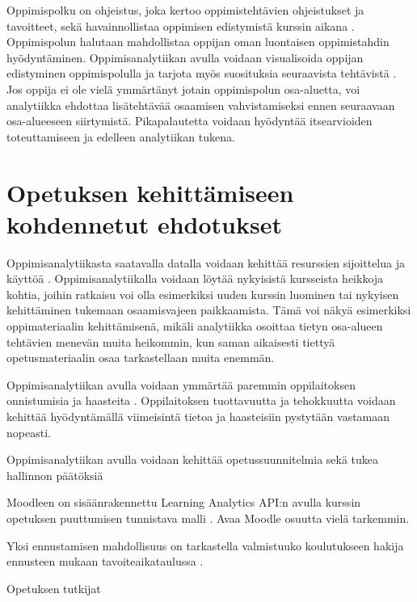 Oppimispolku on ohjeistus, joka kertoo oppimistehtävien ohjeistukset ja tavoitteet, sekä havainnollistaa oppimisen edistymistä kurssin aikana \citep{toivolaFlippedLearningKaanteinen2017}. Oppimispolun halutaan mahdollistaa oppijan oman luontaisen oppimistahdin hyödyntäminen. Oppimisanalytiikan avulla voidaan visualisoida oppijan edistyminen oppimispolulla ja tarjota myös suosituksia seuraavista tehtävistä \citep{longPenetratingFogAnalytics2011}. Jos oppija ei ole vielä ymmärtänyt jotain oppimispolun osa-aluetta, voi analytiikka ehdottaa lisätehtävää osaamisen vahvistamiseksi ennen seuraavaan osa-alueeseen siirtymistä. Pikapalautetta voidaan hyödyntää itsearvioiden toteuttamiseen ja edelleen analytiikan tukena.


\section{Opetuksen kehittämiseen kohdennetut ehdotukset}

\color{blue}
Oppimisanalytiikasta saatavalla datalla voidaan kehittää resurssien sijoittelua ja käyttöä \citep{longPenetratingFogAnalytics2011}. Oppimisanalytiikalla voidaan löytää nykyisistä kursseista heikkoja kohtia, joihin ratkaisu voi olla esimerkiksi uuden kurssin luominen tai nykyisen kehittäminen tukemaan osaamisvajeen paikkaamista. Tämä voi näkyä esimerkiksi oppimateriaalin kehittämisenä, mikäli analytiikka osoittaa tietyn osa-alueen tehtävien menevän muita heikommin, kun saman aikaisesti tiettyä opetusmateriaalin osaa tarkastellaan muita enemmän.

Oppimisanalytiikan avulla voidaan ymmärtää paremmin oppilaitoksen onnistumisia ja haasteita \citep{longPenetratingFogAnalytics2011}. Oppilaitoksen tuottavuutta ja tehokkuutta voidaan kehittää hyödyntämällä viimeisintä tietoa ja haasteisiin pystytään vastamaan nopeasti.

Oppimisanalytiikan avulla voidaan kehittää opetussuunnitelmia sekä tukea hallinnon päätöksiä \citep{romeroEducationalDataMining2010,longPenetratingFogAnalytics2011}

Moodleen on sisäänrakennettu Learning Analytics API:n avulla kurssin opetuksen puuttumisen tunnistava malli \citep{monllaoAnalyticsAPIMoodleDocs2021}. \color{red} Avaa Moodle osuutta vielä tarkemmin. \color{black}

Yksi ennustamisen mahdollisuus on tarkastella valmistuuko koulutukseen hakija ennusteen mukaan tavoiteaikataulussa \citep{barberCourseCorrectionUsing2012a}.

Opetuksen tutkijat \citep{romeroEducationalDataMining2010}

